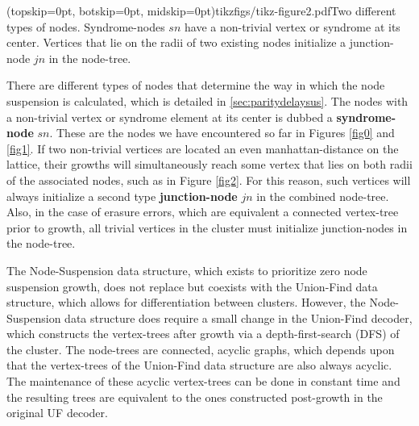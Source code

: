 \Figure[htb](topskip=0pt, botskip=0pt, midskip=0pt){tikzfigs/tikz-figure2.pdf}{Two different types of nodes. Syndrome-nodes $sn$ have a non-trivial vertex or syndrome at its center. Vertices that lie on the radii of two existing nodes initialize a junction-node $jn$ in the node-tree.\label{fig2}}

There are different types of nodes that determine the way in which the node suspension is calculated, which is detailed in \ref{sec:paritydelaysus}. The nodes with a non-trivial vertex or syndrome element at its center is dubbed a \textbf{syndrome-node} $sn$. These are the nodes we have encountered so far in Figures \ref{fig0} and \ref{fig1}. If two non-trivial vertices are located an even manhattan-distance on the lattice, their growths will simultaneously reach some vertex that lies on both radii of the associated nodes, such as in Figure \ref{fig2}. For this reason, such vertices will always initialize a second type \textbf{junction-node} $jn$ in the combined node-tree. Also, in the case of erasure errors, which are equivalent a connected vertex-tree prior to growth, all trivial vertices in the cluster must initialize junction-nodes in the node-tree.

The Node-Suspension data structure, which exists to prioritize zero node suspension growth, does not replace but coexists with the Union-Find data structure, which allows for differentiation between clusters. However, the Node-Suspension data structure does require a small change in the Union-Find decoder, which constructs the vertex-trees after growth via a depth-first-search (DFS) of the cluster. The node-trees are connected, acyclic graphs, which depends upon that the vertex-trees of the Union-Find data structure are also always acyclic. The maintenance of these acyclic vertex-trees can be done in constant time and the resulting trees are equivalent to the ones constructed post-growth in the original UF decoder. 

